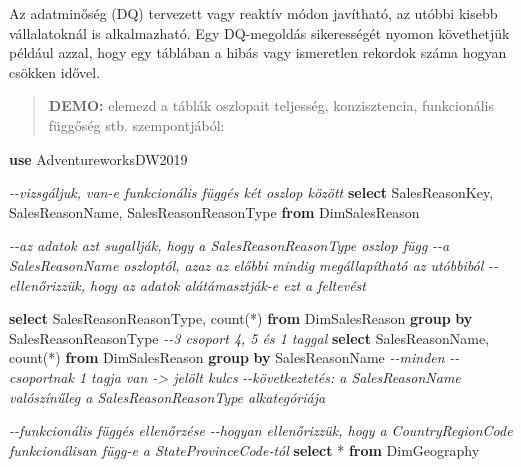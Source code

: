 \documentclass[
  magyar,
]{article}
\newenvironment{Shaded}{}{}
\newcommand{\CommentTok}[1]{\textcolor[rgb]{0.38,0.63,0.69}{\textit{#1}}}
\newcommand{\FunctionTok}[1]{\textcolor[rgb]{0.02,0.16,0.49}{#1}}
\newcommand{\KeywordTok}[1]{\textcolor[rgb]{0.00,0.44,0.13}{\textbf{#1}}}
\newcommand{\NormalTok}[1]{#1}
\newcommand{\OperatorTok}[1]{\textcolor[rgb]{0.40,0.40,0.40}{#1}}
\begin{document}
Az adatminőség (DQ) tervezett vagy reaktív módon javítható, az utóbbi
kisebb vállalatoknál is alkalmazható. Egy DQ-megoldás sikerességét
nyomon követhetjük például azzal, hogy egy táblában a hibás vagy
ismeretlen rekordok száma hogyan csökken idővel.

\begin{quote}
\textbf{DEMO:} elemezd a táblák oszlopait teljesség, konzisztencia,
funkcionális függőség stb. szempontjából:
\end{quote}

\begin{Shaded}
\begin{Highlighting}[]
\KeywordTok{use}\NormalTok{ AdventureworksDW2019}

\CommentTok{{-}{-}vizsgáljuk, van{-}e funkcionális függés két oszlop között}
\KeywordTok{select}\NormalTok{ SalesReasonKey, SalesReasonName, SalesReasonReasonType }\KeywordTok{from}\NormalTok{ DimSalesReason}

\CommentTok{{-}{-}az adatok azt sugallják, hogy a SalesReasonReasonType oszlop függ}
\CommentTok{{-}{-}a SalesReasonName oszloptól, azaz az előbbi mindig megállapítható az utóbbiból}
\CommentTok{{-}{-}ellenőrizzük, hogy az adatok alátámasztják{-}e ezt a feltevést}

\KeywordTok{select}\NormalTok{ SalesReasonReasonType, }\FunctionTok{count}\NormalTok{(}\OperatorTok{*}\NormalTok{) }\KeywordTok{from}\NormalTok{ DimSalesReason }\KeywordTok{group} \KeywordTok{by}
\NormalTok{SalesReasonReasonType  }\CommentTok{{-}{-}3 csoport 4, 5 és 1 taggal}
\KeywordTok{select}\NormalTok{ SalesReasonName, }\FunctionTok{count}\NormalTok{(}\OperatorTok{*}\NormalTok{) }\KeywordTok{from}\NormalTok{ DimSalesReason }\KeywordTok{group} \KeywordTok{by}\NormalTok{ SalesReasonName  }\CommentTok{{-}{-}minden}
\CommentTok{{-}{-}csoportnak 1 tagja van {-}\textgreater{} jelölt kulcs}
\CommentTok{{-}{-}következtetés: a SalesReasonName valószínűleg a SalesReasonReasonType alkategóriája}

\CommentTok{{-}{-}funkcionális függés ellenőrzése}
\CommentTok{{-}{-}hogyan ellenőrizzük, hogy a CountryRegionCode funkcionálisan függ{-}e a StateProvinceCode{-}tól}
\KeywordTok{select} \OperatorTok{*} \KeywordTok{from}\NormalTok{ DimGeography}


\end{Highlighting}
\end{Shaded}
\end{document}

